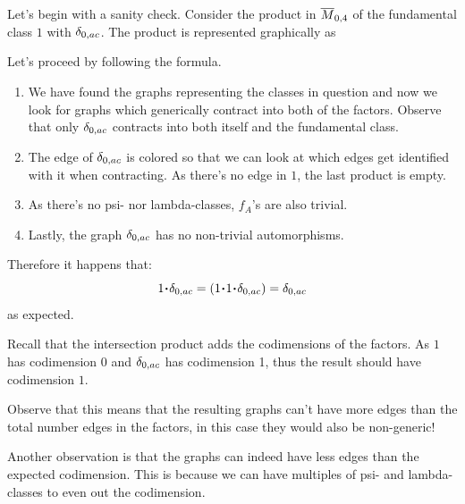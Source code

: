 \documentclass[12pt]{memoir}
\begin{document}
\begin{Ex}
    Let's begin with a sanity check. Consider the product in $\overline M_{0,4}$ of the fundamental class $1$ with $\delta_{0,{ac}}$. The product is represented graphically as\par
    Let's proceed by following the formula.
    \begin{enumerate}
        \item We have found the graphs representing the classes in question and now we look for graphs which generically contract into both of the factors. Observe that only $\delta_{0,{ac}}$ contracts into both itself and the fundamental class.
        \item The edge of $\delta_{0,{ac}}$ is colored so that we can look at which edges get identified with it when contracting. As there's no edge in $1$, the last product is empty.
        \item As there's no psi- nor lambda-classes, $f_A$'s are also trivial.
        \item Lastly, the graph $\delta_{0,{ac}}$ has no non-trivial automorphisms.
    \end{enumerate}
    Therefore it happens that:
    $$1\.\dl_{0,{ac}}=\left(1\.1\.\dl_{0,{ac}}\right)=\dl_{0,{ac}}$$
    as expected.
\end{Ex}

\begin{Rmk}
    Recall that the intersection product adds the codimensions of the factors. As $1$ has codimension $0$ and $\delta_{0,{ac}}$ has codimension 1, thus the result should have codimension $1$.\par
    Observe that this means that the resulting graphs can't have more edges than the total number edges in the factors, in this case they would also be non-generic!\par
    Another observation is that the graphs can indeed have less edges than the expected codimension. This is because we can have multiples of psi- and lambda-classes to even out the codimension.
\end{Rmk}
\end{document}
